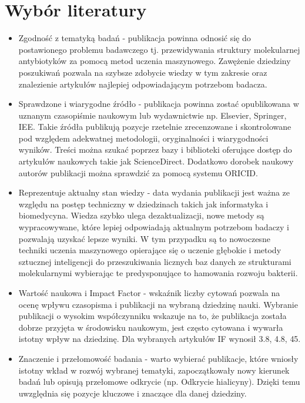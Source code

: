 \section{Wybór literatury}
    \begin{itemize}
        \item Zgodność z tematyką badań - publikacja powinna odnosić się do postawionego problemu badawczego tj. przewidywania struktury molekularnej antybiotyków za pomocą metod uczenia maszynowego. Zawężenie dziedziny poszukiwań pozwala na szybsze zdobycie wiedzy w tym zakresie oraz znalezienie artykułów najlepiej odpowiadającym potrzebom badacza. 
        \item Sprawdzone i wiarygodne źródło - publikacja powinna zostać opublikowana w uznanym czasopiśmie naukowym lub wydawnictwie np. Elsevier, Springer, IEE. Takie źródła publikują pozycje rzetelnie zrecenzowane i skontrolowane pod względem adekwatnej metodologii, oryginalności i wiarygodności wyników. Treści można szukać poprzez bazy i biblioteki oferujące dostęp do artykułów naukowych takie jak ScienceDirect. Dodatkowo dorobek naukowy autorów publikacji można sprawdzić za pomocą systemu ORICID. 
        \item Reprezentuje aktualny stan wiedzy - data wydania publikacji jest ważna ze względu na postęp techniczny w dziedzinach takich jak informatyka i biomedycyna. Wiedza szybko ulega dezaktualizacji, nowe metody są wypracowywane, które lepiej odpowiadają aktualnym potrzebom badaczy i pozwalają uzyskać lepsze wyniki. W tym przypadku są to nowoczesne techniki uczenia maszynowego opierające się o uczenie głębokie i metody sztucznej inteligencji do przeszukiwania licznych baz danych ze strukturami molekularnymi wybierając te predysponujące to hamowania rozwoju bakterii.
        \item Wartość naukowa i Impact Factor - wskaźnik liczby cytowań pozwala na ocenę wpływu czasopisma i publikacji na wybraną dziedzinę nauki. Wybranie publikacji o wysokim współczynniku wskazuje na to, że publikacja została dobrze przyjęta w środowisku naukowym, jest często cytowana i wywarła istotny wpływ na dziedzinę. Dla wybranych artykułów IF wynosił 3.8, 4.8, 45.
        \item Znaczenie i przełomowość badania - warto wybierać publikacje, które wniosły istotny wkład w rozwój wybranej tematyki, zapoczątkowały nowy kierunek badań lub opisują przełomowe odkrycie (np. Odkrycie hialicyny). Dzięki temu uwzględnia się pozycje kluczowe i znaczące dla danej dziedziny.
    \end{itemize}

